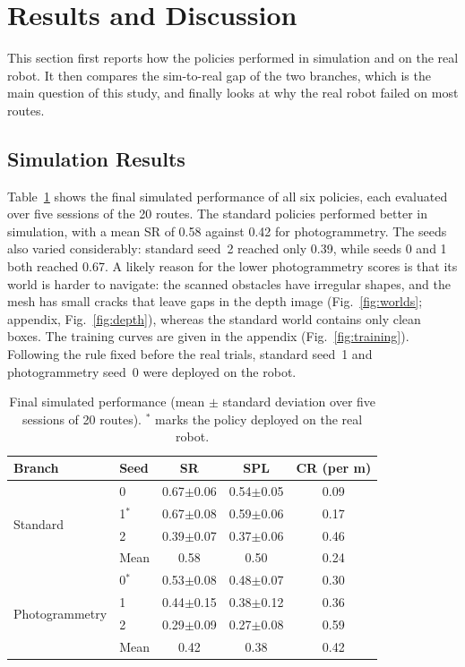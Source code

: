 \section{Results and Discussion}\label{sec:results}
This section first reports how the policies performed in simulation and on the real robot.
It then compares the sim-to-real gap of the two branches, which is the main question of this
study, and finally looks at why the real robot failed on most routes.

\subsection{Simulation Results}
Table~\ref{tab:sim} shows the final simulated performance of all six policies, each evaluated over
five sessions of the 20 routes. The standard policies performed better in simulation, with a mean SR
of 0.58 against 0.42 for photogrammetry. The seeds also varied considerably: standard seed~2 reached
only 0.39, while seeds 0 and 1 both reached 0.67. A likely reason for the lower photogrammetry
scores is that its world is harder to navigate: the scanned obstacles have irregular shapes, and the
mesh has small cracks that leave gaps in the depth image (Fig.~\ref{fig:worlds}; appendix,
Fig.~\ref{fig:depth}), whereas the standard world contains only clean boxes. The training curves are
given in the appendix (Fig.~\ref{fig:training}). Following the rule fixed before the real trials,
standard seed~1 and photogrammetry seed~0 were deployed on the robot.

\begin{table}[t]
\caption{Final simulated performance (mean $\pm$ standard deviation over five sessions of 20
routes). $^\ast$ marks the policy deployed on the real robot.}
\label{tab:sim}
\centering
\footnotesize
\begin{tabular}{@{}llccc@{}}
\toprule
Branch & Seed & SR & SPL & CR (per m) \\
\midrule
\multirow{4}{*}{Standard}
 & 0 & 0.67$\pm$0.06 & 0.54$\pm$0.05 & 0.09 \\
 & 1$^\ast$ & 0.67$\pm$0.08 & 0.59$\pm$0.06 & 0.17 \\
 & 2 & 0.39$\pm$0.07 & 0.37$\pm$0.06 & 0.46 \\
 & Mean & 0.58 & 0.50 & 0.24 \\
\midrule
\multirow{4}{*}{Photogrammetry}
 & 0$^\ast$ & 0.53$\pm$0.08 & 0.48$\pm$0.07 & 0.30 \\
 & 1 & 0.44$\pm$0.15 & 0.38$\pm$0.12 & 0.36 \\
 & 2 & 0.29$\pm$0.09 & 0.27$\pm$0.08 & 0.59 \\
 & Mean & 0.42 & 0.38 & 0.42 \\
\bottomrule
\end{tabular}
\end{table}

